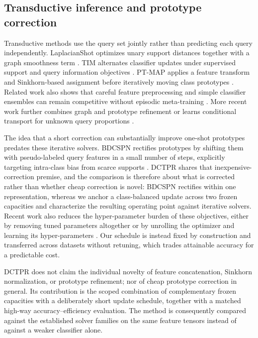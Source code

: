 \documentclass[]{spie}
\newcommand{\method}{\textsc{DCTPR}\xspace}
\begin{document}
\subsection{Transductive inference and prototype correction}

Transductive methods use the query set jointly rather than predicting each query
independently. LaplacianShot optimizes unary support distances together with a
graph smoothness term \cite{laplacianshot}. TIM alternates classifier updates
under supervised support and query information objectives \cite{tim}. PT-MAP
applies a feature transform and Sinkhorn-based assignment before iteratively
moving class prototypes \cite{ptmap}. Related work also shows that careful
feature preprocessing and simple classifier ensembles can remain competitive
without episodic meta-training \cite{squeezefeatures,easy}. More recent work further combines graph
and prototype refinement \cite{iterativegraph} or learns conditional transport
for unknown query proportions \cite{conditionaltransport}.

The idea that a short correction can substantially improve one-shot prototypes
predates these iterative solvers. BDCSPN rectifies prototypes by shifting them
with pseudo-labeled query features in a small number of steps, explicitly
targeting intra-class bias from scarce supports \cite{bdcspn}. \method shares
that inexpensive-correction premise, and the comparison is therefore about what
is corrected rather than whether cheap correction is novel: BDCSPN rectifies
within one representation, whereas we anchor a class-balanced update across two
frozen capacities and characterize the resulting operating point against
iterative solvers. Recent work also reduces the hyper-parameter burden of these
objectives, either by removing tuned parameters altogether
\cite{paddle} or by unrolling the optimizer and learning its
hyper-parameters \cite{unem}. Our schedule is instead fixed by construction and
transferred across datasets without retuning, which trades attainable accuracy
for a predictable cost.

\method does not claim the individual novelty of feature concatenation,
Sinkhorn normalization, or prototype refinement; nor of cheap prototype
correction in general. Its contribution is the scoped
combination of complementary frozen capacities with a deliberately short update
schedule, together with a matched high-way accuracy--efficiency evaluation. The
method is consequently compared against the established solver families on the
same feature tensors instead of against a weaker classifier alone.
\end{document}
